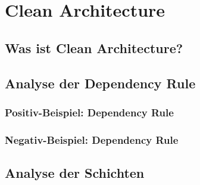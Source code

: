 \chapter{Clean Architecture}

\section{Was ist Clean Architecture?}

\section{Analyse der Dependency Rule}

\subsection{Positiv-Beispiel: Dependency Rule}

\subsection{Negativ-Beispiel: Dependency Rule}

\section{Analyse der Schichten}
